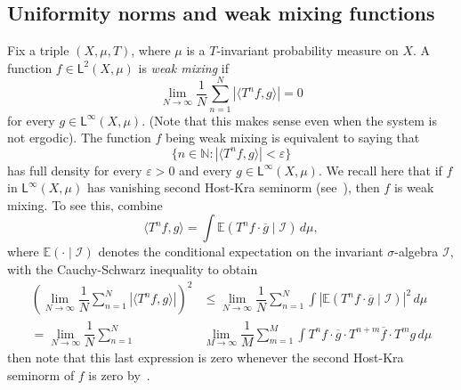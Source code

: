 \documentclass[10pt,dvipsnames]{article}
\theoremstyle{definition}
\theoremstyle{plain}
\newcommand{\define}[1]{\textit{#1}}
\newcommand{\N}{\mathbb{N}}
\newcommand{\E}{\mathbb{E}}
\newcommand{\lp}{\mathsf{L}}
\begin{document}
\begin{appendices}

\section{Uniformity norms and weak mixing functions}

Fix a triple $(X,\mu,T)$,  where $\mu$ is a $T$-invariant probability measure on $X$. 
A function $f\in\lp^2(X,\mu)$ is \define{weak mixing} if
\[
\lim_{N \to \infty} \dfrac{1}{N} \sum_{n=1}^N | \langle T^n f, g \rangle| = 0
\]
for every $g \in \lp^\infty(X,\mu)$.
(Note that this makes sense even when the system  is not ergodic).
The function $f$ being weak mixing is equivalent to saying that
\[
\{ n \in \N : |\langle T^n f, g \rangle| < \varepsilon \}
\]
has full density for every $\varepsilon > 0$ and every $g \in \lp^\infty(X,\mu)$.
We recall here that if $f$ in $\lp^\infty(X,\mu)$ has  vanishing second Host-Kra seminorm (see~\cite[Chapter 8, Section 1]{HK-book}),
then $f$ is weak mixing.
To see this, combine
\[
\langle T^n f, g \rangle = \int \E(T^n f \cdot \overline{g} \mid \mathcal{I} ) \, d\mu,
\]
where $\E(\cdot \mid \mathcal{I})$ denotes the conditional expectation on the invariant $\sigma$-algebra $\mathcal{I}$, with the Cauchy-Schwarz inequality to obtain
\begin{align*}
\left( \lim_{N \to \infty} \dfrac{1}{N} \sum_{n=1}^N | \langle T^n f, g \rangle| \right)^2
& \le
\lim_{N \to \infty} \dfrac{1}{N} \sum_{n=1}^N \int | \E( T^n f \cdot \overline{g} \mid \mathcal{I} ) |^2 \,d \mu
\\ = 
\lim_{N \to \infty} \dfrac{1}{N} \sum_{n=1}^N
& 
\lim_{M \to \infty} \dfrac{1}{M} \sum_{m=1}^M
\int T^n f \cdot \overline{g} \cdot T^{n+m} \overline{f} \cdot T^m g \,d \mu
\end{align*}
then note that this last expression is zero whenever the second Host-Kra seminorm of $f$ is zero by~\cite[Theorem~8.13]{HK-book}.


\end{appendices}
\end{document}
